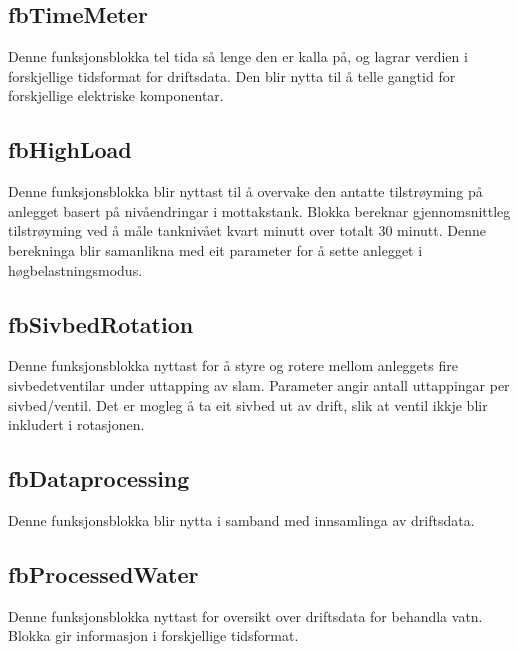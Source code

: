 \subsection{fbTimeMeter}
Denne funksjonsblokka tel tida så lenge den er kalla på, og lagrar verdien i forskjellige tidsformat for driftsdata.
Den blir nytta til å telle gangtid for forskjellige elektriske komponentar.

\newpage

\subsection{fbHighLoad}
Denne funksjonsblokka blir nyttast til å overvake den antatte tilstrøyming på anlegget basert på nivåendringar i mottakstank.
Blokka bereknar gjennomsnittleg tilstrøyming ved å måle tanknivået kvart minutt over totalt 30 minutt.
Denne berekninga blir samanlikna med eit parameter for å sette anlegget i høgbelastningsmodus.

\subsection{fbSivbedRotation}
Denne funksjonsblokka nyttast for å styre og rotere mellom anleggets fire sivbedetventilar under uttapping av slam. 
Parameter angir antall uttappingar per sivbed/ventil.
Det er mogleg å ta eit sivbed ut av drift, slik at ventil ikkje blir inkludert i rotasjonen.

\subsection{fbDataprocessing}
Denne funksjonsblokka blir nytta i samband med innsamlinga av driftsdata. 

\subsection{fbProcessedWater}
Denne funksjonsblokka nyttast for oversikt over driftsdata for behandla vatn. 
Blokka gir informasjon i forskjellige tidsformat.

\newpage

